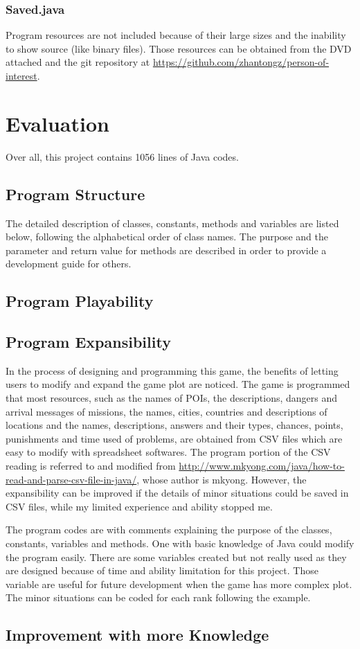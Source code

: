 \documentclass[letterpaper, 12pt]{report}
\begin{document}
\section{Saved.java}


Program resources are not included because of their large sizes and the inability to show source (like binary files). Those resources can be obtained from the DVD attached and the git repository at \url{https://github.com/zhantongz/person-of-interest}.

\part{Evaluation}
Over all, this project contains 1056 lines of Java codes.
\chapter{Program Structure}
The detailed description of classes, constants, methods and variables are listed below, following the alphabetical order of class names. The purpose and the parameter and return value for methods are described in order to provide a development guide for others.

\chapter{Program Playability}
\chapter{Program Expansibility}
In the process of designing and programming this game, the benefits of letting users to modify and expand the game plot are noticed. The game is programmed that most resources, such as the names of POIs, the descriptions, dangers and arrival messages of missions, the names, cities, countries and descriptions of locations and the names, descriptions, answers and their types, chances, points, punishments and time used of problems, are obtained from CSV files which are easy to modify with spreadsheet softwares. The program portion of the CSV reading is referred to and modified from \url{http://www.mkyong.com/java/how-to-read-and-parse-csv-file-in-java/}, whose author is mkyong. However, the expansibility can be improved if the details of minor situations could be saved in CSV files, while my limited experience and ability stopped me.

The program codes are with comments explaining the purpose of the classes, constants, variables and methods. One with basic knowledge of Java could modify the program easily. There are some variables created but not really used as they are designed because of time and ability limitation for this project. Those variable are useful for future development when the game has more complex plot. The minor situations can be coded for each rank following the example.
\chapter{Improvement with more Knowledge}
\end{document}
